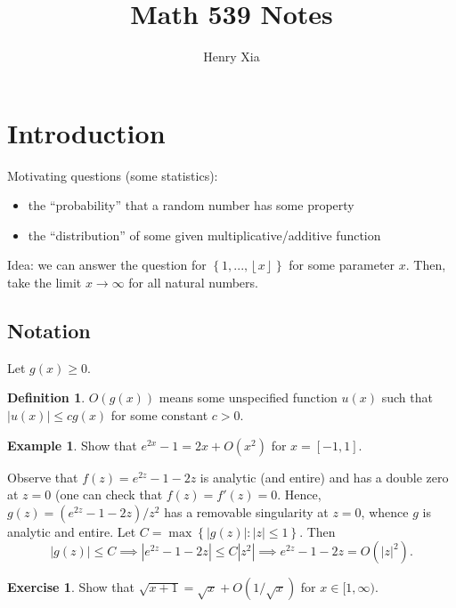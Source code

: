 \documentclass[11pt]{article}
\title{Math 539 Notes}
\author{Henry Xia}
\theoremstyle{definition}
\newtheorem{defn}[thm]{Definition}
\newtheorem{example}[thm]{Example}
\newtheorem{exe}[thm]{Exercise}
\newcommand{\set}[1]{\left\{ #1 \right\}}
\newcommand{\floor}[1]{\left\lfloor #1 \right\rfloor}
\newcommand{\abs}[1]{\left\lvert#1\right\rvert} %
\begin{document}
\maketitle

\tableofcontents


\section{Introduction}

Motivating questions (some statistics):
\begin{itemize}
\item the ``probability'' that a random number has some property
\item the ``distribution'' of some given multiplicative/additive function
\end{itemize}

Idea: we can answer the question for $\set{1,...,\floor{x}}$ for some parameter $x$. Then,
take the limit $x\to\infty$ for all natural numbers.

\subsection{Notation}

Let $g(x)\ge0$.

\begin{defn}
$O(g(x))$ means some unspecified function $u(x)$ such that $\abs{u(x)}\le cg(x)$ for some
constant $c>0$.
\end{defn}

\begin{example}
Show that $e^{2x}-1=2x+O(x^2)$ for $x=[-1,1]$.
\end{example}
\proof
Observe that $f(z)=e^{2z}-1-2z$ is analytic (and entire) and has a double zero at $z=0$
(one can check that $f(z)=f'(z)=0$. Hence, $g(z)=(e^{2z}-1-2z)/z^2$ has a removable
singularity at $z=0$, whence $g$ is analytic and entire. Let
$C=\max\set{\abs{g(z)}:\abs{z}\le1}$. Then
\[
  \abs{g(z)}\le C \implies \abs{e^{2z}-1-2z} \le C\abs{z^2}
  \implies e^{2z}-1-2z = O(\abs{z}^2) .
\]
\qedhere

\begin{exe}
Show that $\sqrt{x+1}=\sqrt{x}+O(1/\sqrt{x})$ for $x\in[1,\infty)$.
\end{exe}
\end{document}
